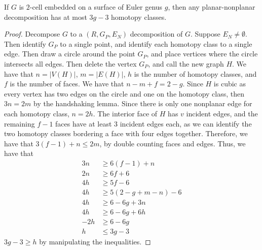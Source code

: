 \begin{lemma}
	If \(G\) is \(2\)-cell embedded on a surface of Euler genus \(g\), then any planar-nonplanar decomposition has at most \(3g-3\) homotopy classes.
\end{lemma}
\begin{proof}
	Decompose \(G\) to a \((R, G_P, E_N)\) decomposition of \(G\). Suppose \(E_N \neq \emptyset\). Then identify \(G_P\) to a single point, and identify each homotopy class to a single edge. Then draw a circle around the point \(G_P\), and place vertices where the circle intersects all edges. Then delete the vertex \(G_P\), and call the new graph \(H\). We have that \(n = |V(H)|\), \(m = |E(H)|\), \(h\) is the number of homotopy classes, and \(f\) is the number of faces. We have that \(n - m + f = 2 - g\). Since \(H\) is cubic as every vertex has two edges on the circle and one on the homotopy class, then \(3n = 2m\) by the handshaking lemma. Since there is only one nonplanar edge for each homotopy class, \(n = 2h\). The interior face of \(H\) has \(v\) incident edges, and the remaining \(f-1\) faces have at least 3 incident edges each, as we can identify the two homotopy classes bordering a face with four edges together. Therefore, we have that \(3(f-1) + n \leq 2m\), by double counting faces and edges. Thus, we have that
	\begin{align*}
		3n  & \geq 6(f - 1) + n         \\
		2n  & \geq 6f + 6               \\
		4h  & \geq 5 f - 6              \\
		4h  & \geq 5(2 - g + m - n) - 6 \\
		4h  & \geq 6 - 6g + 3n          \\
		4h  & \geq 6 - 6g + 6h          \\
		-2h & \geq 6 - 6g               \\
		h   & \leq 3g - 3
	\end{align*}
	\(3g - 3 \geq h\) by manipulating the inequalities.
\end{proof}

